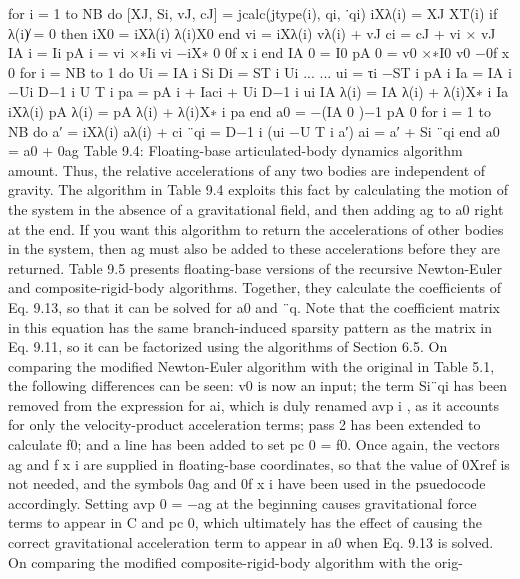 for i = 1 to NB do [XJ, Si, vJ, cJ] = jcalc(jtype(i), qi, ˙qi) iXλ(i) = XJ XT(i) if λ(i)̸ = 0 then iX0 = iXλ(i) λ(i)X0 end vi = iXλ(i) vλ(i) + vJ ci = cJ + vi × vJ IA i = Ii pA i = vi ×∗Ii vi −iX∗ 0 0f x i end IA 0 = I0 pA 0 = v0 ×∗I0 v0 −0f x 0 for i = NB to 1 do Ui = IA i Si Di = ST i Ui ... ... ui = τi −ST i pA i Ia = IA i −Ui D−1 i U T i pa = pA i + Iaci + Ui D−1 i ui IA λ(i) = IA λ(i) + λ(i)X∗ i Ia iXλ(i) pA λ(i) = pA λ(i) + λ(i)X∗ i pa end a0 = −(IA 0 )−1 pA 0 for i = 1 to NB do a′ = iXλ(i) aλ(i) + ci ¨qi = D−1 i (ui −U T i a′) ai = a′ + Si ¨qi end a0 = a0 + 0ag Table 9.4: Floating-base articulated-body dynamics algorithm amount. Thus, the relative accelerations of any two bodies are independent of gravity. The algorithm in Table 9.4 exploits this fact by calculating the motion of the system in the absence of a gravitational field, and then adding ag to a0 right at the end. If you want this algorithm to return the accelerations of other bodies in the system, then ag must also be added to these accelerations before they are returned. Table 9.5 presents floating-base versions of the recursive Newton-Euler and composite-rigid-body algorithms. Together, they calculate the coefficients of Eq. 9.13, so that it can be solved for a0 and ¨q. Note that the coefficient matrix in this equation has the same branch-induced sparsity pattern as the matrix in Eq. 9.11, so it can be factorized using the algorithms of Section 6.5. On comparing the modified Newton-Euler algorithm with the original in Table 5.1, the following differences can be seen: v0 is now an input; the term Si¨qi has been removed from the expression for ai, which is duly renamed avp i , as it accounts for only the velocity-product acceleration terms; pass 2 has been extended to calculate f0; and a line has been added to set pc 0 = f0. Once again, the vectors ag and f x i are supplied in floating-base coordinates, so that the value of 0Xref is not needed, and the symbols 0ag and 0f x i have been used in the psuedocode accordingly. Setting avp 0 = −ag at the beginning causes gravitational force terms to appear in C and pc 0, which ultimately has the effect of causing the correct gravitational acceleration term to appear in a0 when Eq. 9.13 is solved. On comparing the modified composite-rigid-body algorithm with the orig-

